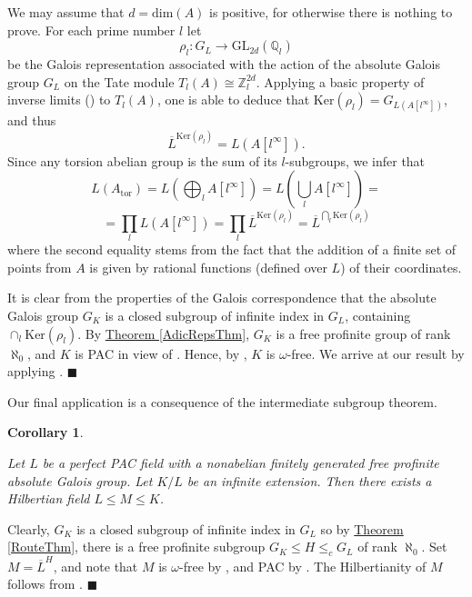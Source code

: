 \documentclass[12pt,a4paper]{article}
\newtheorem{corollary}[theorem]{Corollary}
\newenvironment{proof}[1][Proof]{\begin{trivlist}
\item[\hskip \labelsep {\bfseries #1}]}{\end{trivlist}}
\newcommand{\thmref}[1]{\hyperref[#1]{Theorem \ref*{#1}}}
\begin{document}
\begin{proof}

We may assume that $d = \text{dim}(A)$ is positive, for otherwise there is nothing to prove. For each prime number $l$ let $$\rho_l \colon G_L \to \text{GL}_{2d}(\mathbb{Q}_l)$$ be the Galois representation associated with the action of the absolute Galois group $G_L$ on the Tate module $T_l(A) \cong \mathbb{Z}_l^{2d}.$ Applying a basic property of inverse limits (\cite[Proposition 1.1.10]{RZ}) to $T_l(A)$, one is able to deduce that $\text{Ker}(\rho_l) = G_{L(A[l^\infty])}$, and thus $$\overline{L}^{\text{Ker}(\rho_l)} = L(A[l^{\infty}]).$$ Since any torsion abelian group is the sum of its $l$-subgroups, we infer that $$L(A_{\text{tor}}) = L(\bigoplus_l A[l^\infty]) = L(\bigcup_l A[l^\infty]) = $$ $$ = \prod_l L(A[l^\infty]) = \prod_l \overline{L}^{\text{Ker}(\rho_l)} = \overline{L}^{\bigcap_l \text{Ker}(\rho_l)}$$ where the second equality stems from the fact that the addition of a finite set of points from $A$ is given by rational functions (defined over $L$) of their coordinates.   

It is clear from the properties of the Galois correspondence that the absolute Galois group $G_K$ is a closed subgroup of infinite index in $G_L$, containing $\cap_l \text{Ker}(\rho_l)$. By \thmref{AdicRepsThm}, $G_K$ is a free profinite group of rank $\aleph_0$, and $K$ is PAC in view of \cite[Corollary 11.2.5]{FJ}. Hence, by \cite[Corollary 3.5.10]{RZ}, $K$ is $\omega$-free. We arrive at our result by applying \cite[Corollary 27.3.3]{FJ}. $\blacksquare$

\end{proof}

Our final application is a consequence of the intermediate subgroup theorem.

\begin{corollary} \label{IntSubCor}

Let $L$ be a perfect PAC field with a nonabelian finitely generated free profinite absolute Galois group. Let $K/L$ be an infinite extension. Then there exists a Hilbertian field $L \leq M \leq K$.

\end{corollary}

\begin{proof}

Clearly, $G_K$ is a closed subgroup of infinite index in $G_L$ so by \thmref{RouteThm}, there is a free profinite subgroup $G_K \leq H \leq_c G_L$ of rank $\aleph_0$. Set $M = \overline{L}^H$, and note that $M$ is $\omega$-free by \mbox{\cite[Corollary 3.5.10]{RZ}}, and PAC by \cite[Corollary 11.2.5]{FJ}. The Hilbertianity of $M$ follows from \cite[Corollary 27.3.3]{FJ}. $\blacksquare$

\end{proof}
\end{document}
